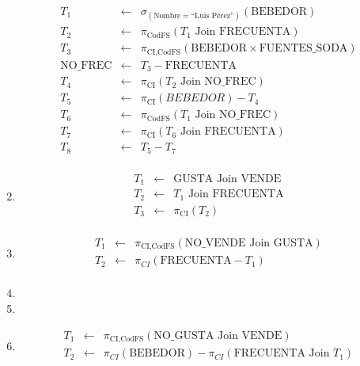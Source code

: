 \documentclass[12pt]{article}
\newcommand{\asig}{\ensuremath{\leftarrow}}
\begin{document}
\begin{enumerate}
\begin{eqnarray*}
 T_1 & \asig & \sigma_{(\text{Nombre}=\text{``Luis Pérez''})}(\text{BEBEDOR}) \\
 T_2 & \asig & \pi_{\text{CodFS}}(T_1 \text{ Join } \text{FRECUENTA}) \\ %
 T_3 & \asig & \pi_{\text{CI,CodFS}}(\text{BEBEDOR} \times \text{FUENTES\_SODA}) \\
 \text{NO\_FREC} & \asig & T_3 - \text{FRECUENTA} \\ %
 T_4 & \asig & \pi_{\text{CI}}(T_2 \text{ Join } \text{NO\_FREC}) \\ %
 T_5 & \asig & \pi_{\text{CI}}(BEBEDOR) - T_4 \\
 T_6 & \asig & \pi_{\text{CodFS}}(T_1 \text{ Join } \text{NO\_FREC}) \\ %
 T_7 & \asig & \pi_{\text{CI}}(T_6 \text{ Join } \text{FRECUENTA}) \\ %
 T_8 & \asig & T_5 - T_7 \\
\end{eqnarray*}

 \item 

\begin{eqnarray*}
 T_1 & \asig & \text{GUSTA} \text{ Join } \text{VENDE} \\
 T_2 & \asig & T_1 \text{ Join } \text{FRECUENTA} \\
 T_3 & \asig & \pi_{\text{CI}}(T_2) \\
\end{eqnarray*}

 \item 

\begin{eqnarray*}
 T_1 & \asig & \pi_{\text{CI,CodFS}}(\text{NO\_VENDE} \text{ Join } \text{GUSTA}) \\
 T_2 & \asig & \pi_{CI}(\text{FRECUENTA}-T_1) \\
\end{eqnarray*}

 \item 

 \item 

 \item 

\begin{eqnarray*}
 T_1 & \asig & \pi_{\text{CI,CodFS}}(\text{NO\_GUSTA} \text{ Join } \text{VENDE}) \\
 T_2 & \asig & \pi_{CI}(\text{BEBEDOR}) - \pi_{CI}(\text{FRECUENTA} \text{ Join } T_1) \\
\end{eqnarray*}


\end{enumerate}
\end{document}
